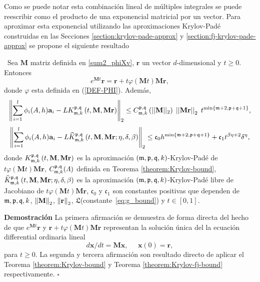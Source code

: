 Como se puede notar esta combinación lineal de múltiples integrales se puede reescribir como el producto de una exponencial matricial por un vector. Para aproximar esta exponencial utilizando las aproximaciones Krylov-Padé construidas en las Secciones \ref{section:krylov-pade-approx} y \ref{section:fj-krylov-pade-approx} se propone el siguiente resultado

\begin{theorem} \label{theorem:Krylov-and-Krylov-fj-bounds}
	\cite{naranjo2023computing}~Sea $\mathbf{M}$ matriz definida en \ref{sum2_phiXv}, $\mathbf{r}$ un vector $d$-dimensional y $t\geq 0$. Entonces
	\[
	e^{\mathbf{M}t}\mathbf{r} = \mathbf{r} + t\varphi (\mathbf{M}t)\mathbf{Mr},
	\]
	donde $\varphi$ esta definida en (\ref{DEF-PHI}). Además,
	\begin{equation}
      \left\Vert\sum\limits_{i=1}^{l}\phi _{i}(A,h)\mathbf{a}_{i}-	L K_{\mathfrak{m},k}^{\mathfrak{p},\mathfrak{q}}\left(t, \mathbf{M}, \mathbf{Mr} \right)
      \right\Vert_2 \leq C_{\mathfrak{m},k}^{\mathfrak{p},\mathfrak{q}}\left(\lvert\lvert \mathbf{M} \rvert\rvert_2\right) \;
	  \left\lvert \left\lvert \mathbf{Mr} \right\rvert \right\rvert_2 \; t^{\mathrm{min}\left\{ \mathfrak{m}+2,\mathfrak{p}+\mathfrak{q}+1 \right\}}, \label{phi_approx}
	\end{equation}
	\begin{equation}
		\left\Vert \sum\limits_{i=1}^{l}\phi _{i}(A,h)\mathbf{a}_{i} - L \widehat{K}_{\mathfrak{m},k}^{\mathfrak{p},\mathfrak{q}}\left(t, \mathbf{M} , \mathbf{Mr} ; \eta, \delta, \beta \right)
		\right\Vert_2 \leq \mathfrak{c}_0 h^{\min\{\mathfrak{m}+2,\mathfrak{p}+\mathfrak{q}+1\}} + \mathfrak{c}_1 t^{\beta\eta+2}\delta^{\eta}, \label{phi_approx_fj}
	\end{equation}
	donde $K_{\mathfrak{m},k}^{\mathfrak{p},\mathfrak{q}}\left(t, \mathbf{M}, \mathbf{Mr} \right)$ es la aproximación $(\mathfrak{m} , \mathfrak{p} ,\mathfrak{q} , k)$-Krylov-Padé de $t\varphi (\mathbf{M}t)\mathbf{Mr}$,  $C_{\mathfrak{m},k}^{\mathfrak{p},\mathfrak{q}}(\varLambda)$ definida en Teorema \ref{theorem:Krylov-bound}, $\widehat{K}_{\mathfrak{m},k}^{\mathfrak{p},\mathfrak{q}}\left(t, \mathbf{M} , \mathbf{Mr} ; \eta, \delta, \beta \right)$  es la aproximación $(\mathfrak{m} , \mathfrak{p} ,\mathfrak{q} , k)$-Krylov-Padé libre de Jacobiano de $t\varphi (\mathbf{M}t)\mathbf{Mr}$, $\mathfrak{c}_0$ y $\mathfrak{c}_1$ son constantes positivas que dependen de $\mathfrak{m},\mathfrak{p},\mathfrak{q},k$, $\left\lVert \mathbf{M} \right\rVert_2$, $\left\lVert \mathbf{r} \right\rVert_2$, $\mathfrak{L}$(constante~\ref{eq:g_bound}) y $t \in [0,1]$.
\end{theorem}
\textbf{Demostración} La primera afirmación se demuestra de forma directa del hecho de que $e^{\mathbf{M}t}\mathbf{r}$ y $\mathbf{r} + t\varphi (\mathbf{M}t)\mathbf{Mr}$ representan la solución única del la ecuación differential ordinaria lineal
\[ d\mathbf{x}/dt= \mathbf{M}\mathbf{x},  \;\;\;\;\; \mathbf{x}(0)=\mathbf{r}, \]
para $t\geq 0$. La segunda y tercera afirmación son resultado directo de aplicar el Teorema \ref{theorem:Krylov-bound} y Teorema \ref{theorem:Krylov-fj-bound} respectivamente.
$\square$

